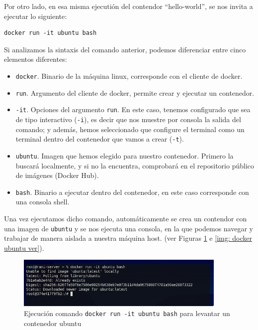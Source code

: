 \documentclass[12pt]{article}
\begin{document}
	\noindent Por otro lado, en esa misma ejecutión del contendor ``hello-world'', se nos invita a ejecutar lo siguiente:
	\begin{verbatim}
docker run -it ubuntu bash
	\end{verbatim}

	\noindent Si analizamos la sintaxis del comando anterior, podemos diferenciar entre cinco elementos diferentes:
	\begin{itemize}
		\item \texttt{docker}. Binario de la máquina linux, corresponde con el cliente de docker.
		\item \texttt{run}. Argumento del cliente de docker, permite crear y ejecutar un contenedor.
		\item \texttt{-it}. Opciones del argumento \texttt{run}. En este caso, tenemos configurado que sea de tipo interactivo (\texttt{-i}), es decir que nos muestre por consola la salida del comando; y además, hemos seleccionado que configure el terminal como un terminal dentro del contenedor que vamos a crear (\texttt{-t}).
		\item \texttt{ubuntu}. Imagen que hemos elegido para nuestro contenedor. Primero la buscará localmente, y si no la encuentra, comprobará en el repositorio público de imágenes (Docker Hub).
		\item \texttt{bash}. Binario a ejecutar dentro del contenedor, en este caso corresponde con una consola shell.
	\end{itemize}

	\noindent Una vez ejecutamos dicho comando, automáticamente se crea un contendor con una imagen de \texttt{ubuntu} y se nos ejecuta una consola, en la que podemos navegar y trabajar de manera aislada a nuestra máquina host. (ver Figuras \ref{img: docker ubuntu} e \ref{img: docker ubuntu ver}).
	
	\pagebreak
	
	\begin{figure}[h]
		\begin{center}
			\includegraphics[width=0.9\textwidth]{img/docker_ubuntu.png}
			\caption{Ejecución comando \texttt{docker run -it ubuntu bash} para levantar un contenedor ubuntu}
			\label{img: docker ubuntu}
		\end{center}
	\end{figure}
\end{document}

